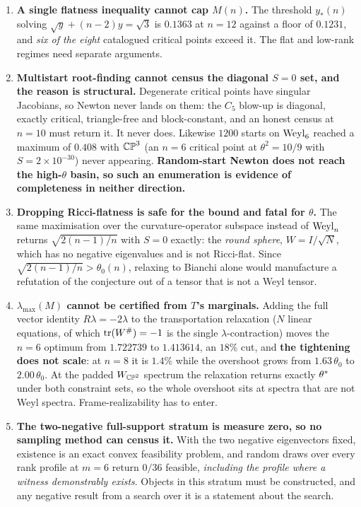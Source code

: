 \begin{enumerate}[leftmargin=1.8em]
\item \textbf{A single flatness inequality cannot cap $M(n)$.} The threshold $y_*(n)$ solving $\sqrt y+(n-2)y=\sqrt3$ is $0.1363$ at $n=12$ against a floor of $0.1231$, and \emph{six of the eight} catalogued critical points exceed it. The flat and low-rank regimes need separate arguments.

\item \textbf{Multistart root-finding cannot census the diagonal $S=0$ set, and the reason is structural.} Degenerate critical points have singular Jacobians, so Newton never lands on them: the $C_5$ blow-up is diagonal, exactly critical, triangle-free and block-constant, and an honest census at $n=10$ must return it. It never does. Likewise $1200$ starts on $\mathrm{Weyl}_6$ reached a maximum of $0.408$ with $\mathbb{CP}^3$ (an $n=6$ critical point at $\theta^2=10/9$ with $S=2\times10^{-30}$) never appearing. \textbf{Random-start Newton does not reach the high-$\theta$ basin, so such an enumeration is evidence of completeness in neither direction.}

\item \textbf{Dropping Ricci-flatness is safe for the bound and fatal for $\theta$.} The same maximisation over the curvature-operator subspace instead of $\mathrm{Weyl}_n$ returns $\sqrt{2(n-1)/n}$ with $S=0$ exactly: the \emph{round sphere}, $W=I/\sqrt N$, which has no negative eigenvalues and is not Ricci-flat. Since $\sqrt{2(n-1)/n}>\theta_0(n)$, relaxing to Bianchi alone would manufacture a refutation of the conjecture out of a tensor that is not a Weyl tensor.

\item \textbf{$\lambda_{\max}(M)$ cannot be certified from $T$'s marginals.} Adding the full vector identity $R\lambda=-2\lambda$ to the transportation relaxation ($N$ linear equations, of which $\operatorname{tr}(W^{\#})=-1$ is the single $\lambda$-contraction) moves the $n=6$ optimum from $1.722739$ to $1.413614$, an $18\%$ cut, and \textbf{the tightening does not scale}: at $n=8$ it is $1.4\%$ while the overshoot grows from $1.63\,\theta_0$ to $2.00\,\theta_0$. At the padded $W_{\mathbb{CP}^2}$ spectrum the relaxation returns exactly $\theta^{*}$ under both constraint sets, so the whole overshoot sits at spectra that are not Weyl spectra. Frame-realizability has to enter.

\item \textbf{The two-negative full-support stratum is measure zero, so no sampling method can census it.} With the two negative eigenvectors fixed, existence is an exact convex feasibility problem, and random draws over every rank profile at $m=6$ return $0/36$ feasible, \emph{including the profile where a witness demonstrably exists}. Objects in this stratum must be constructed, and any negative result from a search over it is a statement about the search.


\end{enumerate}
